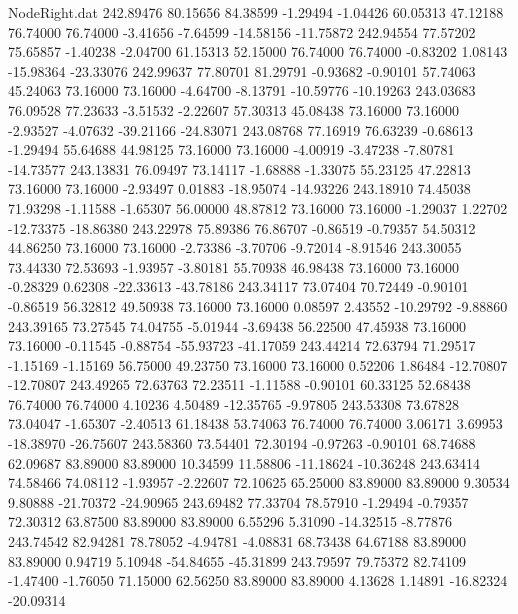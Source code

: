 \begin{filecontents}{NodeRight.dat}
 242.89476   80.15656   84.38599    -1.29494   -1.04426   60.05313   47.12188   76.74000   76.74000   -3.41656   -7.64599  -14.58156  -11.75872
 242.94554   77.57202   75.65857    -1.40238   -2.04700   61.15313   52.15000   76.74000   76.74000   -0.83202    1.08143  -15.98364  -23.33076
 242.99637   77.80701   81.29791    -0.93682   -0.90101   57.74063   45.24063   73.16000   73.16000   -4.64700   -8.13791  -10.59776  -10.19263
 243.03683   76.09528   77.23633    -3.51532   -2.22607   57.30313   45.08438   73.16000   73.16000   -2.93527   -4.07632  -39.21166  -24.83071
 243.08768   77.16919   76.63239    -0.68613   -1.29494   55.64688   44.98125   73.16000   73.16000   -4.00919   -3.47238   -7.80781  -14.73577
 243.13831   76.09497   73.14117    -1.68888   -1.33075   55.23125   47.22813   73.16000   73.16000   -2.93497    0.01883  -18.95074  -14.93226
 243.18910   74.45038   71.93298    -1.11588   -1.65307   56.00000   48.87812   73.16000   73.16000   -1.29037    1.22702  -12.73375  -18.86380
 243.22978   75.89386   76.86707    -0.86519   -0.79357   54.50312   44.86250   73.16000   73.16000   -2.73386   -3.70706   -9.72014   -8.91546
 243.30055   73.44330   72.53693    -1.93957   -3.80181   55.70938   46.98438   73.16000   73.16000   -0.28329    0.62308  -22.33613  -43.78186
 243.34117   73.07404   70.72449    -0.90101   -0.86519   56.32812   49.50938   73.16000   73.16000    0.08597    2.43552  -10.29792   -9.88860
 243.39165   73.27545   74.04755    -5.01944   -3.69438   56.22500   47.45938   73.16000   73.16000   -0.11545   -0.88754  -55.93723  -41.17059
 243.44214   72.63794   71.29517    -1.15169   -1.15169   56.75000   49.23750   73.16000   73.16000    0.52206    1.86484  -12.70807  -12.70807
 243.49265   72.63763   72.23511    -1.11588   -0.90101   60.33125   52.68438   76.74000   76.74000    4.10236    4.50489  -12.35765   -9.97805
 243.53308   73.67828   73.04047    -1.65307   -2.40513   61.18438   53.74063   76.74000   76.74000    3.06171    3.69953  -18.38970  -26.75607
 243.58360   73.54401   72.30194    -0.97263   -0.90101   68.74688   62.09687   83.89000   83.89000   10.34599   11.58806  -11.18624  -10.36248
 243.63414   74.58466   74.08112    -1.93957   -2.22607   72.10625   65.25000   83.89000   83.89000    9.30534    9.80888  -21.70372  -24.90965
 243.69482   77.33704   78.57910    -1.29494   -0.79357   72.30312   63.87500   83.89000   83.89000    6.55296    5.31090  -14.32515   -8.77876
 243.74542   82.94281   78.78052    -4.94781   -4.08831   68.73438   64.67188   83.89000   83.89000    0.94719    5.10948  -54.84655  -45.31899
 243.79597   79.75372   82.74109    -1.47400   -1.76050   71.15000   62.56250   83.89000   83.89000    4.13628    1.14891  -16.82324  -20.09314

\end{filecontents}
